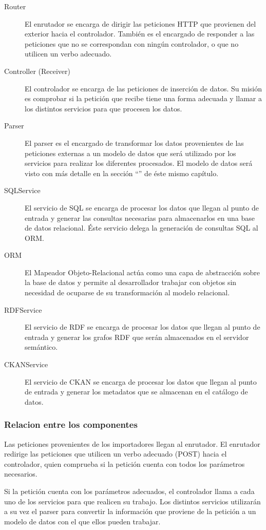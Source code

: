\begin{description}
	\item[Router]  El enrutador se encarga de dirigir las peticiones HTTP que provienen del exterior hacia el controlador.  También es el encargado de responder a las peticiones que no se correspondan con ningún controlador, o que no utilicen un verbo adecuado.
	\item[Controller (Receiver)]  El controlador se encarga de las peticiones de inserción de datos.  Su misión es comprobar si la petición que recibe tiene una forma adecuada y llamar a los distintos servicios para que procesen los datos.
	\item[Parser]  El parser es el encargado de transformar los datos provenientes de las peticiones externas a un modelo de datos que será utilizado por los servicios para realizar los diferentes procesados.  El modelo de datos será visto con más detalle en la sección ``'' de éste mismo capítulo.
	\item[SQLService]  El servicio de SQL se encarga de procesar los datos que llegan al punto de entrada y generar las consultas necesarias para almacenarlos en una base de datos relacional.  Éste servicio delega la generación de consultas SQL al ORM.
	\item[ORM]  El Mapeador Objeto-Relacional actúa como una capa de abstracción sobre la base de datos y permite al desarrollador trabajar con objetos sin necesidad de ocuparse de su transformación al modelo relacional.
	\item[RDFService]  El servicio de RDF se encarga de procesar los datos que llegan al punto de entrada y generar los grafos RDF que serán almacenados en el servidor semántico.
	\item[CKANService]  El servicio de CKAN se encarga de procesar los datos que llegan al punto de entrada y generar los metadatos que se almacenan en el catálogo de datos.
\end{description}


\subsubsection{Relacion entre los componentes}
Las peticiones provenientes de los importadores llegan al enrutador.  El enrutador redirige las peticiones que utilicen un verbo adecuado (POST) hacia el controlador, quien comprueba si la petición cuenta con todos los parámetros necesarios.

Si la petición cuenta con los parámetros adecuados, el controlador llama a cada uno de los servicios para que realicen su trabajo.  Los distintos servicios utilizarán a su vez el parser para convertir la información que proviene de la petición a un modelo de datos con el que ellos pueden trabajar.


